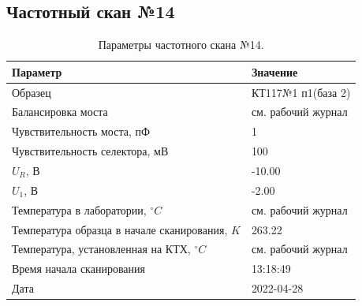 \subsection{Частотный скан №14}
\begin{table}[!ht]
    \centering
    \caption{Параметры частотного скана №14.}
    \begin{tabular}{|l|l|}
        \hline
        Параметр                                       & Значение                  \\ \hline
        Образец                                        & КТ117№1 п1(база 2)        \\ \hline
        Балансировка моста                             & см. рабочий журнал        \\ \hline
        Чувствительность моста, пФ                     & 1                         \\ \hline
        Чувствительность селектора, мВ                 & 100                       \\ \hline
        $U_R$, В                                       & -10.00                    \\ \hline
        $U_1$, В                                       & -2.00                     \\ \hline
        Температура в лаборатории, $^\circ C$          & см. рабочий журнал        \\ \hline
        Температура образца в начале сканирования, $K$ & 263.22                    \\ \hline
        Температура, установленная на КТХ, $^\circ C$  & см. рабочий журнал        \\ \hline
        Время начала сканирования                      & 13:18:49                  \\ \hline
        Дата                                           & 2022-04-28                \\ \hline
    \end{tabular}
    \label{table:frequency_scan_14}
\end{table}

